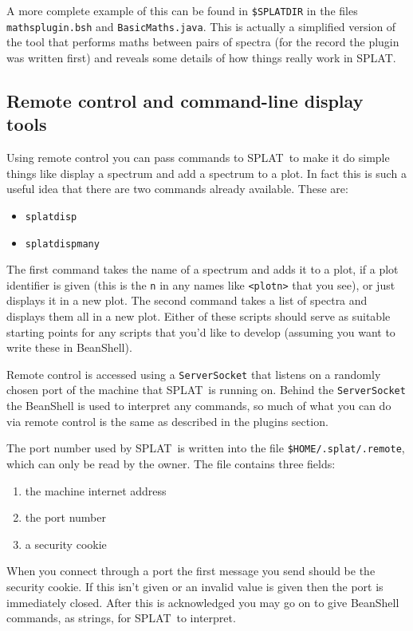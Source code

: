 \documentclass[twoside,11pt]{article}
\renewcommand{\_}{\texttt{\symbol{95}}}
\newcommand{\SPLAT}{\textsf{SPLAT}}
\newcommand{\hitext}[1]{\texttt{#1}}
\begin{document}
A more complete example of this can be found in
\hitext{\$SPLAT\_DIR} in the files \hitext{maths\_plugin.bsh} and
\hitext{BasicMaths.java}. This is actually a simplified version of the
tool that performs maths between pairs of spectra (for the record the
plugin was written first) and reveals some details of how things
really work in \SPLAT.

\subsection{Remote control and command-line display tools}

Using remote control you can pass commands to \SPLAT\ to make it do
simple things like display a spectrum and add a spectrum to a plot. In
fact this is such a useful idea that there are two commands already
available. These are:
\begin{itemize}
\item \hitext{splatdisp}
\item \hitext{splatdispmany}
\end{itemize}
The first command takes the name of a spectrum and adds it to a plot,
if a plot identifier is given (this is the \hitext{n} in any names
like \hitext{<plotn>} that you see), or just displays it in a new
plot. The second command takes a list of spectra and displays them all
in a new plot. Either of these scripts should serve as suitable
starting points for any scripts that you'd like to develop (assuming
you want to write these in BeanShell).

Remote control is accessed using a \hitext{ServerSocket} that listens
on a randomly chosen port of the machine that \SPLAT\ is running
on. Behind the \hitext{ServerSocket} the BeanShell is used to
interpret any commands, so much of what you can do via remote control
is the same as described in the plugins section.

The port number used by \SPLAT\ is written into the file
\hitext{\$HOME/.splat/.remote}, which can only be read by the
owner. The file contains three fields:
\begin{enumerate}
\item the machine internet address
\item the port number
\item a security cookie
\end{enumerate}
When you connect through a port the first message you send should be
the security cookie. If this isn't given or an invalid value is given
then the port is immediately closed. After this is acknowledged you
may go on to give BeanShell commands, as strings, for \SPLAT\ to
interpret.
\end{document}
